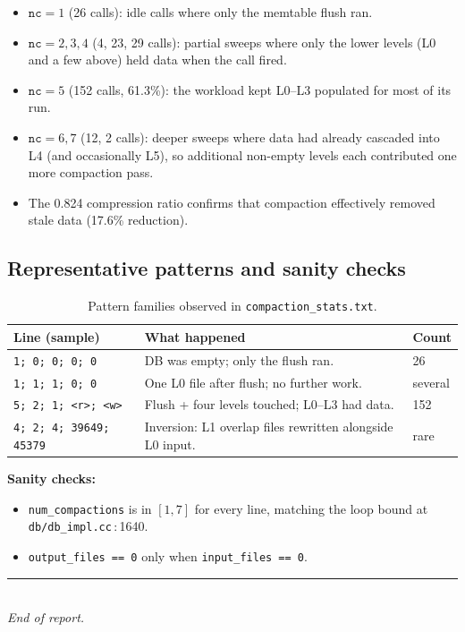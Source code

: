 \documentclass[11pt,a4paper]{article}
\newcommand{\codref}[2]{\textcolor{accent}{\texttt{\small#1}}\,$\!:\!$\textcolor{primary!70!black}{\small#2}}
\newcommand{\sym}[1]{\texttt{#1}}
\begin{document}
\begin{itemize}[leftmargin=1.4em,itemsep=2pt]
    \item $\sym{nc}=1$ (26 calls): idle calls where only the memtable flush ran.
    \item $\sym{nc}=2,3,4$ (4, 23, 29 calls): partial sweeps where only the lower levels (L0 and a few above) held data when the call fired.
    \item $\sym{nc}=5$ (152 calls, 61.3\%): the workload kept L0--L3 populated for most of its run.
    \item $\sym{nc}=6,7$ (12, 2 calls): deeper sweeps where data had already cascaded into L4 (and occasionally L5), so additional non-empty levels each contributed one more compaction pass.
    \item The 0.824 compression ratio confirms that compaction effectively removed stale data (17.6\% reduction).
\end{itemize}

\subsection{Representative patterns and sanity checks}

\begin{table}[htbp]
\centering
\caption{Pattern families observed in \texttt{compaction\_stats.txt}.}
\label{tab:patterns}
\renewcommand{\arraystretch}{1.2}
\small
\begin{tabularx}{\linewidth}{@{}lXl@{}}
\toprule
\textbf{Line (sample)} & \textbf{What happened} & \textbf{Count} \\
\midrule
\sym{1; 0; 0; 0; 0}          & DB was empty; only the flush ran.                                   & 26 \\
\sym{1; 1; 1; 0; 0}          & One L0 file after flush; no further work.                           & several \\
\sym{5; 2; 1; <r>; <w>}      & Flush + four levels touched; L0--L3 had data.                       & 152 \\
\sym{4; 2; 4; 39649; 45379}  & Inversion: L1 overlap files rewritten alongside L0 input.           & rare \\
\bottomrule
\end{tabularx}
\end{table}

\noindent\textbf{Sanity checks:}
\begin{itemize}[leftmargin=1.4em,itemsep=2pt]
    \item \sym{num\_compactions} is in $[1, 7]$ for every line, matching the loop bound at \codref{db/db\_impl.cc}{1640}.
    \item \sym{output\_files == 0} only when \sym{input\_files == 0}.
\end{itemize}

\vspace{1em}
\begin{center}
{\color{primary}\rule{0.4\linewidth}{0.6pt}}\\[0.4em]
{\small\itshape\color{primary!70!black}End of report.}
\end{center}
\end{document}
